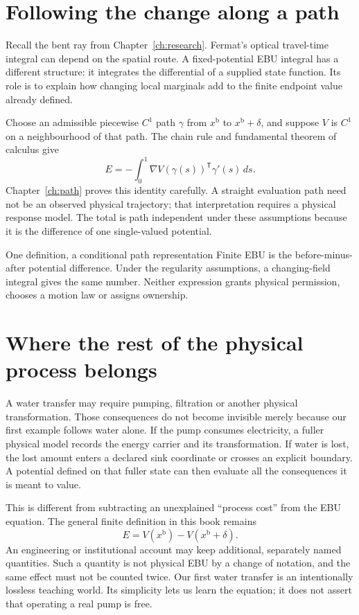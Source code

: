 \section{Following the change along a path}
Recall the bent ray from Chapter~\ref{ch:research}. Fermat's optical travel-time integral can depend on the spatial route. A fixed-potential EBU integral has a different structure: it integrates the differential of a supplied state function. Its role is to explain how changing local marginals add to the finite endpoint value already defined.

Choose an admissible piecewise $C^1$ path $\gamma$ from $x^{\mathrm{b}}$ to $x^{\mathrm{b}}+\delta$, and suppose $V$ is $C^1$ on a neighbourhood of that path. The chain rule and fundamental theorem of calculus give
\begin{equation}\label{eq:intro-ebu-path}
 E=-\int_0^1\nabla V(\gamma(s))^{\mathsf T}\gamma'(s)\,ds.
\end{equation}
Chapter~\ref{ch:path} proves this identity carefully. A straight evaluation path need not be an observed physical trajectory; that interpretation requires a physical response model. The total is path independent under these assumptions because it is the difference of one single-valued potential.

\begin{intuitionbox}{One definition, a conditional path representation}
Finite EBU is the before-minus-after potential difference. Under the regularity assumptions, a changing-field integral gives the same number. Neither expression grants physical permission, chooses a motion law or assigns ownership.
\end{intuitionbox}

\section{Where the rest of the physical process belongs}
A water transfer may require pumping, filtration or another physical transformation. Those consequences do not become invisible merely because our first example follows water alone. If the pump consumes electricity, a fuller physical model records the energy carrier and its transformation. If water is lost, the lost amount enters a declared sink coordinate or crosses an explicit boundary. A potential defined on that fuller state can then evaluate all the consequences it is meant to value.

This is different from subtracting an unexplained ``process cost'' from the EBU equation. The general finite definition in this book remains
\begin{equation}\label{eq:intro-ebu-net}
 E=V(x^{\mathrm{b}})-V(x^{\mathrm{b}}+\delta).
\end{equation}
An engineering or institutional account may keep additional, separately named quantities. Such a quantity is not physical EBU by a change of notation, and the same effect must not be counted twice. Our first water transfer is an intentionally lossless teaching world. Its simplicity lets us learn the equation; it does not assert that operating a real pump is free.

